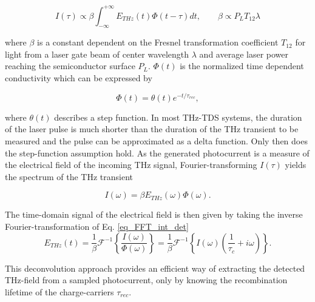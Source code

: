 \begin{equation}
		I(\tau) \propto \beta \int_{-\infty}^{+\infty} E_{THz}(t)\Phi(t - \tau)dt,
		\qquad \beta \propto P_L T_{12} \lambda
	\label{eq_conv_integration_detection_2}
\end{equation}

where $\beta$ is a constant dependent on the Fresnel transformation coefficient $T_{12}$ for light from a laser gate beam of center wavelength $\lambda$ and average laser power reaching the semiconductor surface $P_L$. $\Phi(t)$ is the normalized time dependent conductivity which can be expressed by 

\begin{equation}
	\Phi(t) = \theta(t)e^{-t/\tau_{rec}},
\end{equation}

where $\theta(t)$ describes a step function. In most THz-TDS systems, the duration of the laser pulse is much shorter than the duration of the THz transient to be measured and the pulse can be approximated as a delta function. Only then does the step-function assumption hold. As the generated photocurrent is a measure of the electrical field of the incoming THz signal, Fourier-transforming $I(\tau)$ yields the spectrum of the THz transient

\begin{equation}
	I(\omega) = \beta E_{THz}(\omega) \Phi(\omega). 
	\label{eq_FFT_int_det}
\end{equation}

The time-domain signal of the electrical field is then given by taking the inverse Fourier-transformation of Eq. \ref{eq_FFT_int_det}
\begin{equation}
	E_{THz}(t) = \frac{1}{\beta} \mathcal{F}^{-1}\left\{\frac{I(\omega)}{\Phi(\omega)} \right\} =  \frac{1}{\beta} \mathcal{F}^{-1} \left\{I(\omega)(\frac{1}{\tau_c} + i \omega)
	 \right\}.
\end{equation}

This deconvolution approach provides an efficient way of extracting the detected THz-field from a sampled photocurrent, only by knowing the recombination lifetime of the charge-carriers $\tau_{rec}$. 

